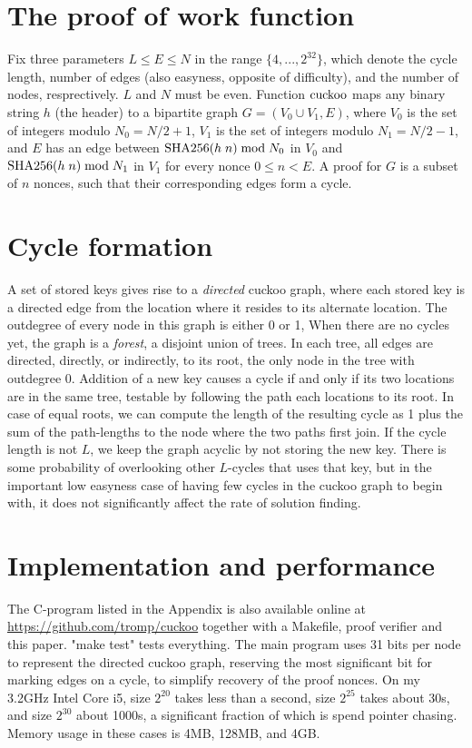 \documentclass[11pt, oneside]{article}
\newcommand{\cuckoo}{{\rm cuckoo}}
\newcommand{\sha}{{\rm SHA256}}
\begin{document}
\section{The proof of work function}
Fix three parameters $L \leq E \leq N$ in the range $\{4,...,2^{32}\}$, which
denote the cycle length, number of edges (also easyness, opposite of difficulty),
and the number of nodes, resprectively. $L$ and $N$ must be even.
Function $\cuckoo$ maps any binary string $h$ (the header) to a bipartite graph
$G = (V_0 \cup V_1, E)$, where $V_0$ is the set of integers modulo $N_0=N/2+1$,
$V_1$ is the set of integers modulo $N_1=N/2-1$, and $E$ has an edge between
$\sha(h\;n) \bmod N_0$ in $V_0$ and $\sha(h\;n) \bmod N_1$ in $V_1$ for every
nonce $0 \leq n < E$.  A proof for $G$ is a subset of $n$ nonces, such that
their corresponding edges form a cycle.

\section{Cycle formation}
A set of stored keys gives rise to a {\em directed} cuckoo graph, where each
stored key is a directed edge from the location where it resides to its
alternate location. The outdegree of every node in this
graph is either 0 or 1, When there are no cycles yet, the graph is a {\em
forest}, a disjoint union of trees. In each tree, all edges are directed,
directly, or indirectly, to its root,
the only node in the tree with outdegree 0. Addition of a new key causes a
cycle if and only if its two locations are in the same tree, testable
by following the path each locations to its root.
In case of equal roots, we can compute the length of the resulting cycle as
1 plus the sum of the path-lengths to the node where the two paths first join.
If the cycle length is not $L$, we keep the graph
acyclic by not storing the new key. There is some probability of overlooking
other $L$-cycles
that uses that key, but in the important low easyness case of having few cycles
in the cuckoo graph to begin with, it does not significantly affect
the rate of solution finding.

\section{Implementation and performance}
The C-program listed in the Appendix is also available online at
\url{https://github.com/tromp/cuckoo} together with a Makefile,
proof verifier and this paper. "make test" tests everything.
The main program uses 31 bits per node to represent the
directed cuckoo graph, reserving the most significant bit
for marking edges on a cycle, to simplify recovery of the proof nonces.
On my 3.2GHz Intel Core i5, size $2^{20}$ takes less than a second, size
$2^{25}$ takes about 30s, and size $2^{30}$ about 1000s, a significant fraction
of which is spend pointer chasing.
Memory usage in these cases is 4MB, 128MB, and 4GB.
\end{document}
